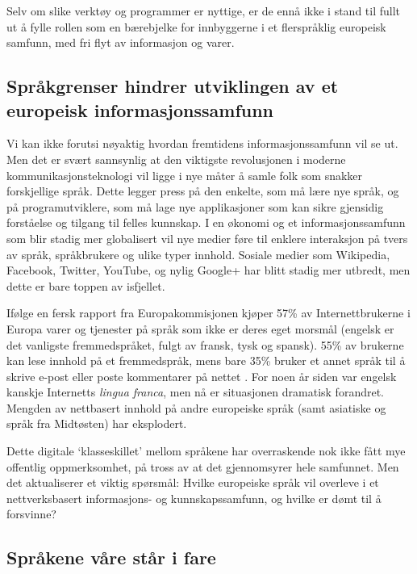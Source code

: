 \begin{multicols}{2}
Selv om slike verktøy og programmer er nyttige, er de ennå ikke i stand til fullt ut å fylle rollen som en bærebjelke for innbyggerne i et flerspråklig europeisk samfunn, med fri flyt av informasjon og varer.

\subsection[Språkgrenser hindrer utviklingen av et europeisk informasjonssamfunn]{Språkgrenser hindrer utviklingen av et europeisk informasjonssamfunn}

Vi kan ikke forutsi nøyaktig hvordan fremtidens informasjonssamfunn vil se ut. Men det er svært sannsynlig at den viktigste revolusjonen i moderne kommunikasjonsteknologi vil ligge i nye måter å samle folk som snakker forskjellige språk. Dette legger press på den enkelte, som må lære nye språk, og på programutviklere, som må lage nye applikasjoner som kan sikre gjensidig forståelse og tilgang til felles kunnskap. I en økonomi og et informasjonssamfunn som blir stadig mer globalisert vil nye medier føre til enklere interaksjon på tvers av språk, språkbrukere og ulike typer innhold. Sosiale medier som Wikipedia, Facebook, Twitter, YouTube, og nylig Google+ har blitt stadig mer utbredt, men dette er bare toppen av isfjellet.


Ifølge en fersk rapport fra Europakommisjonen kjøper 57\% av Internettbrukerne i Europa varer og tjenester på språk som ikke er deres eget morsmål (engelsk er det vanligste fremmedspråket, fulgt av fransk, tysk og spansk). 55\% av brukerne kan lese innhold på et fremmedspråk, mens bare 35\% bruker et annet språk til å skrive e-post eller poste kommentarer på nettet \cite{EC1}. For noen år siden var  engelsk kanskje Internetts \textit{lingua franca}, men nå er situasjonen dramatisk forandret. Mengden av nettbasert innhold på andre europeiske språk (samt asiatiske og språk fra Midtøsten) har eksplodert.

Dette digitale `klasseskillet' mellom språkene har overraskende nok ikke fått mye offentlig oppmerksomhet, på tross av at det gjennomsyrer hele samfunnet. Men det aktualiserer et viktig spørsmål: Hvilke europeiske språk vil overleve i et nettverksbasert informasjons- og kunnskapssamfunn, og hvilke er dømt til å forsvinne?

\subsection{Språkene våre står i fare}


\end{multicols}
